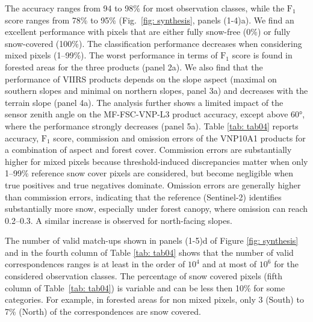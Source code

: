 \documentclass[tc, manuscript]{copernicus}
\begin{document}
The accuracy ranges from 94 to 98\% for most observation classes, while the $\mathrm{F_1}$ score ranges from 78\% to 95\% (Fig.~\ref{fig: synthesis}, panels (1-4)a). We find an excellent performance with pixels that are either fully snow-free (0\%) or fully snow-covered (100\%). The classification performance decreases when considering mixed pixels (1–99\%). The worst performance in terms of $\mathrm{F_1}$ score is found in forested areas for the three products (panel 2a). We also find that the performance of VIIRS products depends on the slope aspect (maximal on southern slopes and minimal on northern slopes, panel 3a) and decreases with the terrain slope (panel 4a). The analysis further shows a limited impact of the sensor zenith angle on the MF-FSC-VNP-L3 product accuracy, except above 60°, where the performance strongly decreases (panel 5a). Table \ref{tab: tab04} reports accuracy, $\mathrm{F_1}$ score, commission and omission errors of the VNP10A1 products for a combination of aspect and forest cover. Commission errors are substantially higher for mixed pixels because threshold-induced discrepancies matter when only 1–99\% reference snow cover pixels are considered, but become negligible when true positives and true negatives dominate. Omission errors are generally higher than commission errors, indicating that the reference (Sentinel-2) identifies substantially more snow, especially under forest canopy, where omission can reach 0.2–0.3. A similar increase is observed for north-facing slopes. 

The number of valid match-ups shown in panels (1-5)d of Figure \ref{fig: synthesis} and in the fourth column of Table \ref{tab: tab04} shows that the number of valid correspondences ranges is at least in the order of $10^4$ and at most of $10^6$ for the considered observation classes. The percentage of snow covered pixels (fifth column of Table~\ref{tab: tab04}) is variable and can be less then 10\% for some categories. For example, in forested areas for non mixed pixels, only 3 (South) to 7\% (North) of the correspondences are snow covered.
\end{document}
